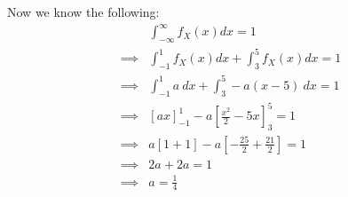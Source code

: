 \documentclass{article}
\begin{document}
Now we know the following:
\begin{align*}
             & \int_{-\infty}^{\infty} f_X(x) dx = 1                           \\
    \implies &
    \int_{-1}^{1} f_X(x) dx + \int_{3}^{5} f_X(x) dx = 1                       \\
    \implies &
    \int_{-1}^{1} a \ dx + \int_{3}^{5} -a(x-5) \ dx = 1                       \\
    \implies &
    [ax]_{-1}^{1} - a \left[ \frac{x^2}{2} - 5x \right]_{3}^{5} = 1            \\
    \implies &
    a \left[ 1 + 1 \right] - a \left[ -\frac{25}{2} + \frac{21}{2} \right] = 1 \\
    \implies &
    2a + 2a = 1                                                                \\
    \implies &
    a = \frac{1}{4}                                                            \\
\end{align*}
\end{document}

